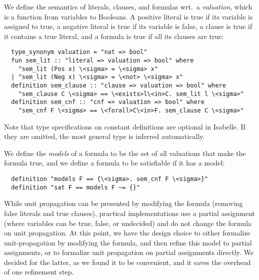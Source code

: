 \documentclass[smallcondensed]{svjour3}     %
\begin{document}
We define the semantics of literals, clauses, and formulas wrt.~a \emph{valuation}, which is a function from variables to Booleans.
A positive literal is true if its variable is assigned to true, a negative literal is true if its variable is false, a clause is true if it
contains a true literal, and a formula is true if all its clauses are true:
\begin{lstlisting}
  type_synonym valuation = "nat => bool"
  fun sem_lit :: "literal => valuation => bool" where
    "sem_lit (Pos x) \<sigma> = \<sigma> x"
  | "sem_lit (Neg x) \<sigma> = \<not> \<sigma> x"
  definition sem_clause :: "clause => valuation => bool" where
    "sem_clause C \<sigma> == \<exists>l\<in>C. sem_lit l \<sigma>"
  definition sem_cnf :: "cnf => valuation => bool" where
    "sem_cnf F \<sigma> == \<forall>C\<in>F. sem_clause C \<sigma>"
\end{lstlisting}
Note that type specifications on constant definitions are optional in Isabelle. If they are omitted, the most general type is inferred automatically.

We define the \emph{models} of a formula to be the set of all valuations that make the formula true, 
and we define a formula to be satisfiable if it has a model:
\begin{lstlisting}
  definition "models F == {\<sigma>. sem_cnf F \<sigma>}"
  definition "sat F == models F ~= {}"
\end{lstlisting}

While unit propagation can be presented by modifying the formula (removing false literals and true clauses),
practical implementations use a partial assignment (where variables can be true, false, or undecided) and do not change the formula on unit propagation.
At this point, we have the design choice to either formalize unit-propagation by modifying the formula, and then refine this model to partial 
assignments, or to formalize unit propagation on partial assignments directly. We decided for the latter, as we found it to be convenient, 
and it saves the overhead of one refinement step.
\end{document}
